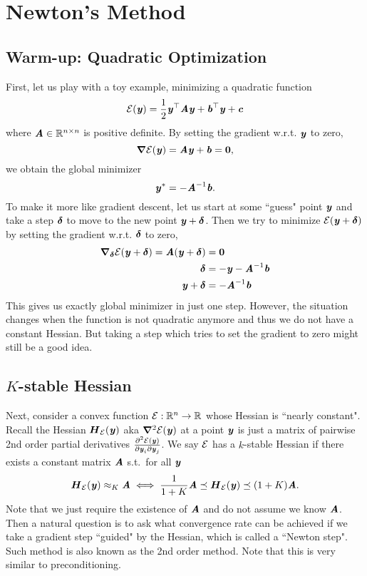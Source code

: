 \section{Newton's Method}
\subsection{Warm-up: Quadratic Optimization}
First, let us play with a toy example, minimizing a quadratic function
\[ \calE(\yy) = \frac{1}{2}\yy^\trp\AA\yy + \bb^\trp\yy + \cc \]
where $\AA\in\R^{n \times n}$ is positive definite. By setting the gradient w.r.t. $\yy$ to zero,
\[ \grad\calE(\yy) = \AA\yy + \bb = \matzero, \]
we obtain the global minimizer
\[ \yy^* = -\AA^{-1}\bb. \]
To make it more like gradient descent, let us start at some ``guess" point $\yy$ and take a step $\ddelta$ to move to the new point $\yy+\ddelta$. Then we try to minimize $\calE(\yy+\ddelta)$ by setting the gradient w.r.t. $\ddelta$ to zero,
\begin{align*}
  \grad_{\ddelta} \calE(\yy+\ddelta) = \AA(\yy+\ddelta) &= \matzero \\
  \ddelta & = -\yy-\AA^{-1}\bb \\
  \yy+\ddelta &= -\AA^{-1}\bb
\end{align*}
This gives us exactly global minimizer in just one step.
However, the situation changes when the function is not quadratic anymore and thus we do not have a constant Hessian. But taking a step which tries to set the gradient to zero might still be a good idea.

\subsection{$K$-stable Hessian}
Next, consider a convex function $\calE:\R^n\to\R$ whose Hessian is ``nearly constant". Recall the Hessian $\HH_{\calE}(\yy)$ aka $\grad^2\calE(\yy)$ at a point $\yy$ is just a matrix of pairwise 2nd order partial derivatives $\frac{\partial^2\calE(\yy)}{\partial\yy_i\partial\yy_j}$. We say $\calE$ has a $k$-stable Hessian if there exists a constant matrix $\AA$ s.t.\ for all $\yy$
\[ \HH_{\calE}(\yy) \approx_{K} \AA \iff
\frac{1}{1+K}\AA \preceq \HH_{\calE}(\yy) \preceq (1+K)\AA. \]
Note that we just require the existence of $\AA$ and do not assume we know $\AA$.
Then a natural question is to ask what convergence rate can be achieved if we take a gradient step ``guided" by the Hessian, which is called a ``Newton step". Such method is also known as the 2nd order method. Note that this is very similar to preconditioning.

